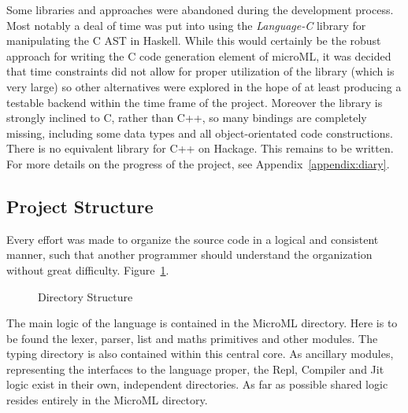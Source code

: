 \documentclass[12pt, a4paper]{report}
\begin{document}
Some libraries and approaches were abandoned during the development process. Most notably a deal of
time was put into using the \textit{Language-C} library for manipulating the C AST in Haskell. While
this would certainly be the robust approach for writing the C code generation element of microML,
it was decided that time constraints did not allow for proper utilization of the library (which is
very large) so other alternatives were explored in the hope of at least producing a testable backend
within the time frame of the project. Moreover the library is strongly inclined to C, rather than
C++, so many bindings are completely missing, including some data types and all object-orientated
code constructions. There is no equivalent library for C++ on Hackage. This remains to be written.
For more details on the progress of the project, see Appendix~\ref{appendix:diary}.

\subsection{Project Structure}
Every effort was made to organize the source code in a logical and consistent manner, such that
another programmer should understand the organization without great difficulty.
Figure~\ref{fig:dir}.

\begin{figure}[H]
\caption{Directory Structure}
\label{fig:dir}
\end{figure}

The main logic of the language is contained in the MicroML directory. Here is to be found the lexer,
parser, list and maths primitives and other modules. The typing directory is also contained within this
central core. As ancillary modules, representing the interfaces to the language proper, the Repl,
Compiler and Jit logic exist in their own, independent directories. As far as possible shared logic
resides entirely in the MicroML directory.
\end{document}
